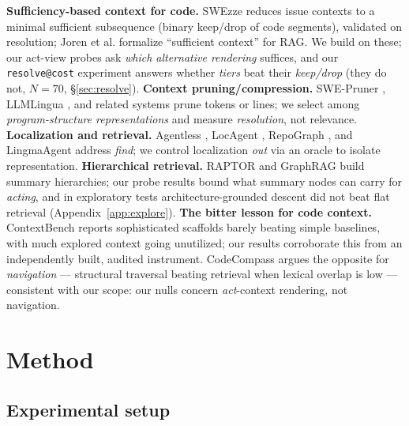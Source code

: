 \documentclass{article}
\makeatletter
\newcommand{\resolveatcost}{\texttt{resolve@cost}}
\makeatother
\begin{document}
\textbf{Sufficiency-based context for code.} SWEzze \citep{swezze} reduces issue contexts to a
minimal sufficient subsequence (binary keep/drop of code segments), validated on resolution;
Joren et al.
\citep{sufficientcontext} formalize ``sufficient context'' for RAG. We build on these; our
act-view probes ask \emph{which alternative rendering} suffices, and our \resolveatcost{}
experiment answers whether \emph{tiers} beat their \emph{keep/drop} (they do not, $N{=}70$,
\S\ref{sec:resolve}).
\textbf{Context pruning/compression.} SWE-Pruner \citep{swepruner}, LLMLingua \citep{llmlingua},
and related systems prune tokens or lines; we select among \emph{program-structure
representations} and measure \emph{resolution}, not relevance.
\textbf{Localization and retrieval.} Agentless \citep{agentless}, LocAgent \citep{locagent},
RepoGraph \citep{repograph}, and LingmaAgent \citep{repounderstander} address \emph{find}; we
control localization \emph{out} via an oracle to isolate representation.
\textbf{Hierarchical retrieval.} RAPTOR \citep{raptor} and GraphRAG \citep{graphrag} build
summary hierarchies; our probe results bound what summary nodes can carry for \emph{acting}, and
in exploratory tests architecture-grounded descent did not beat flat retrieval
(Appendix~\ref{app:explore}).
\textbf{The bitter lesson for code context.} ContextBench \citep{contextbench} reports
sophisticated scaffolds barely beating simple baselines, with much explored context going
unutilized; our results corroborate this from an independently built, audited instrument.
CodeCompass \citep{codecompass} argues the opposite for \emph{navigation} --- structural
traversal beating retrieval when lexical overlap is low --- consistent with our scope: our nulls
concern \emph{act}-context rendering, not navigation.

\section{Method}
\label{sec:method}

\subsection{Experimental setup}
\label{sec:setup}
\end{document}
